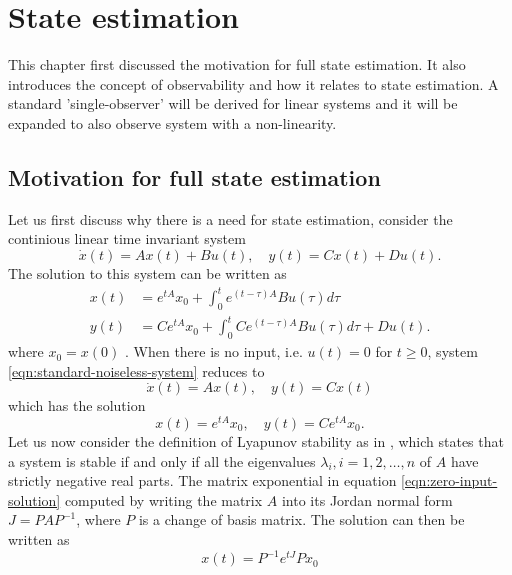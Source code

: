 \section{State estimation}\label{ch:state-estimation}
This chapter first discussed the motivation for full state estimation. It also introduces the concept of observability and how it relates to state estimation. A standard 'single-observer' will be derived for linear systems and it will be expanded to also observe system with a non-linearity.


\subsection{Motivation for full state estimation}
Let us first discuss why there is a need for state estimation, consider the continious linear time invariant system
\begin{equation}\label{eqn:standard-noiseless-system}
    \dot{x}(t) = Ax(t) + Bu(t), \quad y(t) = Cx(t) + Du(t).
\end{equation}
The solution to this system can be written as
\begin{equation*}
    \begin{split}
        x(t) &= e^{tA}x_{0} + \int_{0}^{t}e^{(t-\tau)A}Bu(\tau)d\tau \\
        y(t) &= Ce^{tA}x_{0} + \int_{0}^{t}Ce^{(t-\tau)A}Bu(\tau)d\tau + Du(t).
    \end{split}
\end{equation*}
where $x_0 = x(0)$ \cite[Eqn. 6.4]{Hespanha2018LinearTheory}. When there is no input, i.e. $u(t)=0$ for $t \geq 0$, system \eqref{eqn:standard-noiseless-system} reduces to
\begin{equation*}
    \dot{x}(t) = Ax(t), \quad y(t) = Cx(t)
\end{equation*}
which has the solution
\begin{equation}\label{eqn:zero-input-solution}
    x(t) = e^{tA}x_0, \quad y(t) = Ce^{tA}x_0.
\end{equation}
Let us now consider the definition of Lyapunov stability as in \cite[Th. 8.2]{Hespanha2018LinearTheory}, which states that a system is stable if and only if all the eigenvalues $\lambda_i,i=1,2,\dots,n$ of $A$ have strictly negative real parts. The matrix exponential in equation \eqref{eqn:zero-input-solution} computed by writing the matrix $A$ into its Jordan normal form $J=PAP^{-1}$, where $P$ is a change of basis matrix. The solution can then be written as 
\begin{equation}\label{eqn:jordan-form-exponential}
    x(t) = P^{-1}e^{tJ}Px_0
\end{equation}
